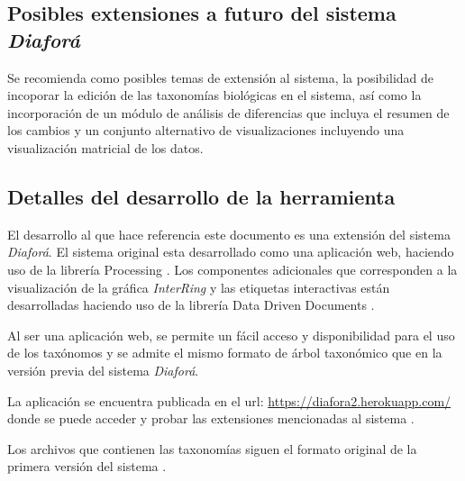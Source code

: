 \documentclass[journal]{IEEEtran}
\begin{document}
\subsection{Posibles extensiones a futuro del sistema \emph{Diaforá}}

Se recomienda como posibles temas de extensión al sistema, la posibilidad de incoporar la edición 
de las taxonomías biológicas en el sistema, así como la incorporación de un módulo de análisis de diferencias
que incluya el resumen de los cambios y un conjunto alternativo de visualizaciones incluyendo una visualización matricial
de los datos.

\subsection{Detalles del desarrollo de la herramienta}
El desarrollo al que hace referencia este documento es una extensión del sistema \emph{Diaforá}\cite{sancho_diafora}.
El sistema original esta desarrollado como una aplicación web, 
haciendo uso de la librería Processing \cite{p5js2020}.
Los componentes adicionales que corresponden a la visualización de la gráfica \emph{InterRing} y las etiquetas
interactivas están desarrolladas haciendo uso de la librería Data Driven Documents \cite{DDD}.

Al ser una aplicación web, se permite un fácil acceso y disponibilidad para el uso de los taxónomos y se admite el 
mismo formato de árbol taxonómico que en la versión previa del sistema \emph{Diaforá}.

La aplicación se encuentra publicada en el url: \underline{https://diafora2.herokuapp.com/} donde se puede acceder y probar las extensiones
mencionadas al sistema \cite{Diaforá}.

Los archivos que contienen las taxonomías siguen el formato original de la primera versión del sistema \cite{sancho_diafora}. \\
\end{document}
